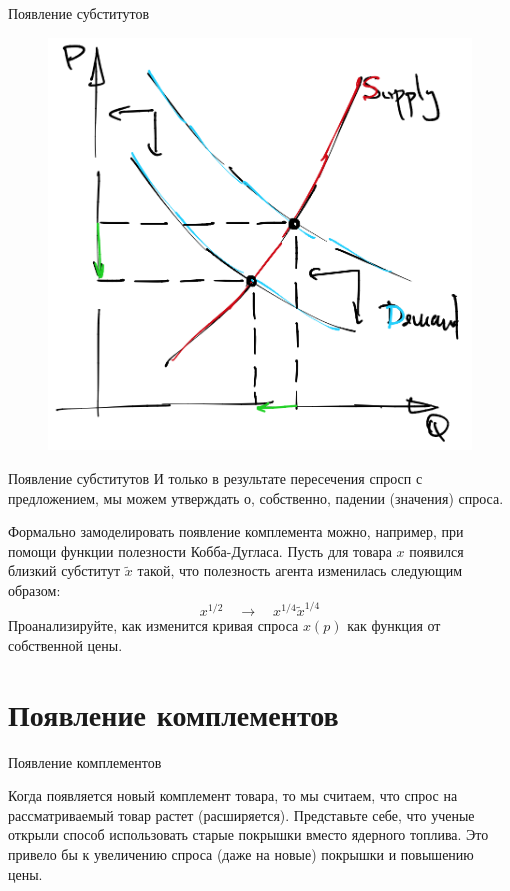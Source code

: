 \documentclass{beamer}
\begin{document}
\begin{frame}{Появление субститутов}
\begin{figure}[hbt]
\centering
\includegraphics[width=.7 \textwidth]{dem_contract.png}
\end{figure}
\end{frame}

\begin{frame}{Появление субститутов}
И только в результате пересечения спросп с предложением, мы можем утверждать о, собственно, падении (значения) спроса.

Формально замоделировать появление комплемента можно, например, при помощи функции полезности Кобба-Дугласа. Пусть для товара $x$ появился близкий субститут $\tilde x$ такой, что полезность агента изменилась следующим образом:
$$ x^{1/2} \quad \to \quad x^{1/4}\tilde x^{1/4}$$
Проанализируйте, как изменится кривая спроса $x(p)$ как функция от собственной цены.

\end{frame}

\section{Появление комплементов}

\begin{frame}{Появление комплементов}

Когда появляется новый комплемент товара, то мы считаем, что спрос на рассматриваемый товар растет (расширяется). Представьте себе, что ученые открыли способ использовать старые покрышки вместо ядерного топлива. Это привело бы к увеличению спроса (даже на новые) покрышки и повышению цены.

\end{frame}
\end{document}
